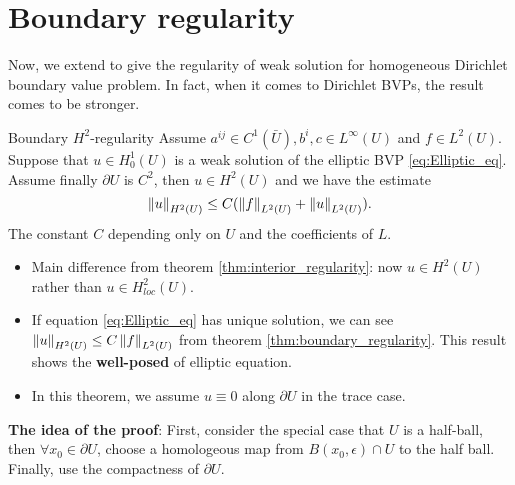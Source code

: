 \section{Boundary regularity}
Now, we extend to give the regularity of weak solution for homogeneous Dirichlet boundary value problem. In fact, when it comes to Dirichlet BVPs, the result comes to be stronger.
\begin{theorem}{Boundary $H^{2}$-regularity}
    \label{thm:boundary_regularity}
Assume $a^{ij}\in C^{1}(\bar{U}), b^{i},c\in L^{\infty}(U)$ and $f\in L^{2}(U)$. Suppose that $u\in H_{0}^{1}(U)$ is a weak solution of the elliptic BVP \eqref{eq:Elliptic_eq}. Assume finally $\partial U$ is $C^{2}$, then $u\in H^{2}(U)$ and we have the estimate
\begin{equation}
    \label{eq:estimate_for_Dirichlet}
    \left\|u\right\|_{H^{2}(U)}\le C(\left\|f\right\|_{L^{2}(U)}+\left\|u\right\|_{L^{2}(U)}).
\end{equation}
The constant $C$ depending only on $U$ and the coefficients of $L$.
\end{theorem}
\begin{remark}
    \begin{itemize}
        \item Main difference from theorem \ref{thm:interior_regularity}: now $u\in H^{2}(U)$ rather than $u\in H_{loc}^{2}(U)$.
        \item If equation \eqref{eq:Elliptic_eq} has unique solution, we can see $\left\|u\right\|_{H^{2}(U)}\le C\left\|f\right\|_{L^{2}(U)}$ from theorem \ref{thm:boundary_regularity}. This result shows the \textbf{well-posed} of elliptic equation.
        \item In this theorem, we assume $u\equiv 0$ along $\partial U$ in the trace case.
    \end{itemize}
\end{remark}
\textbf{The idea of the proof}: First, consider the special case that $U$ is a half-ball, then $\forall x_{0}\in \partial U$, choose a homologeous map from $B(x_{0},\epsilon)\cap U$ to the half ball. Finally, use the compactness of $\partial U$.
